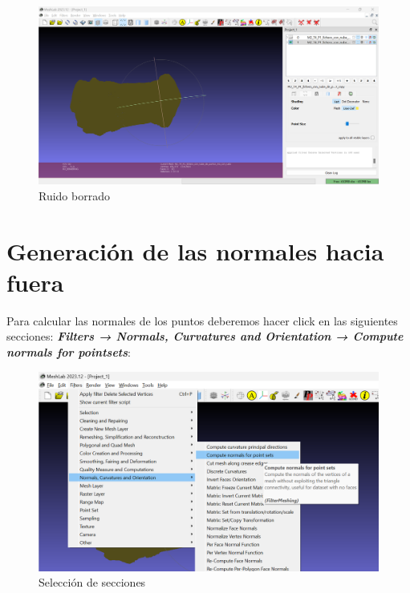 \documentclass{article}
\begin{document}
\begin{figure}[H]
    \centering
    \includegraphics[scale=0.34]{images/ruido_04.png}
    \caption{Ruido borrado}
\end{figure}

\pagebreak

\section{Generación de las normales hacia fuera}

Para calcular las normales de los puntos deberemos hacer click en las siguientes secciones: \textbf{\textit{Filters → Normals, Curvatures and Orientation → Compute normals for pointsets}}:

\begin{figure}[H]
    \centering
    \includegraphics[scale=0.34]{images/normales_01.png}
    \caption{Selección de secciones}
\end{figure}
\end{document}
